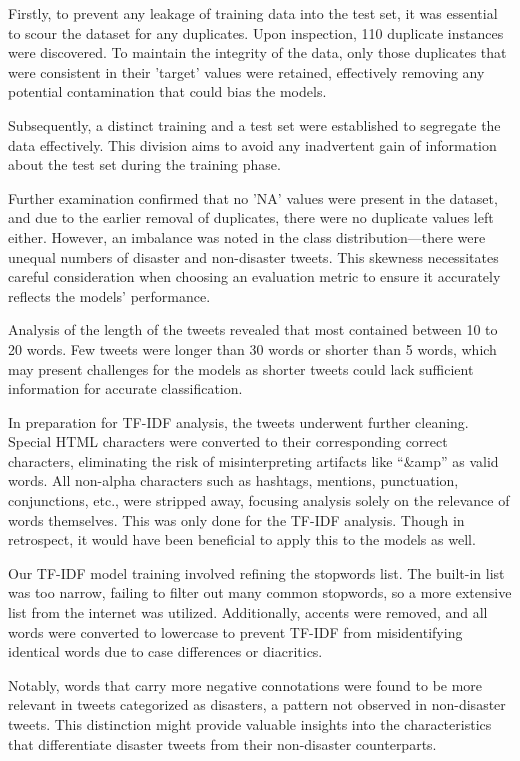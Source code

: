 \documentclass[10pt,table]{article}
\begin{document}
Firstly, to prevent any leakage of training data into the test set, it was essential to scour the dataset for any duplicates. Upon inspection, 110 duplicate instances were discovered. To maintain the integrity of the data, only those duplicates that were consistent in their 'target' values were retained, effectively removing any potential contamination that could bias the models.

Subsequently, a distinct training and a test set were established to segregate the data effectively. This division aims to avoid any inadvertent gain of information about the test set during the training phase.

Further examination confirmed that no 'NA' values were present in the dataset, and due to the earlier removal of duplicates, there were no duplicate values left either. However, an imbalance was noted in the class distribution—there were unequal numbers of disaster and non-disaster tweets. This skewness necessitates careful consideration when choosing an evaluation metric to ensure it accurately reflects the models' performance.

Analysis of the length of the tweets revealed that most contained between 10 to 20 words. Few tweets were longer than 30 words or shorter than 5 words, which may present challenges for the models as shorter tweets could lack sufficient information for accurate classification.

In preparation for TF-IDF analysis, the tweets underwent further cleaning. Special HTML characters were converted to their corresponding correct characters, eliminating the risk of misinterpreting artifacts like \enquote{\&amp} as valid words. All non-alpha characters such as hashtags, mentions, punctuation, conjunctions, etc., were stripped away, focusing analysis solely on the relevance of words themselves. This was only done for the TF-IDF analysis. Though in retrospect, it would have been beneficial to apply this to the models as well.

Our TF-IDF model training involved refining the stopwords list. The built-in list was too narrow, failing to filter out many common stopwords, so a more extensive list from the internet was utilized. Additionally, accents were removed, and all words were converted to lowercase to prevent TF-IDF from misidentifying identical words due to case differences or diacritics.

Notably, words that carry more negative connotations were found to be more relevant in tweets categorized as disasters, a pattern not observed in non-disaster tweets. This distinction might provide valuable insights into the characteristics that differentiate disaster tweets from their non-disaster counterparts.
\end{document}
